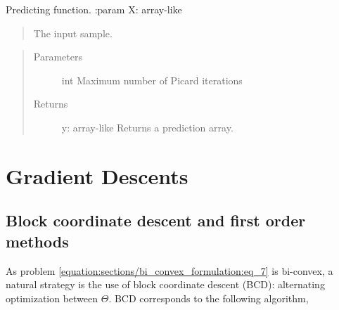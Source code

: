 \documentclass[letterpaper,10pt,english]{sphinxmanual}
\begin{document}
\begin{fulllineitems}
\begin{fulllineitems}
\end{fulllineitems}


\begin{fulllineitems}
\label{\detokenize{sections/learning:IDL.IDLModel.predict}}
Predicting function.
:param X: array-like
\begin{quote}

The input sample.
\end{quote}
\begin{quote}\begin{description}
\item[{Parameters}] \leavevmode
{} \textendash{} int
Maximum number of Picard iterations

\item[{Returns}] \leavevmode
y: array-like
Returns a prediction array.

\end{description}\end{quote}

\end{fulllineitems}


\end{fulllineitems}



\chapter{Gradient Descents}
\label{\detokenize{sections/gradient_descents:gradient-descents}}\label{\detokenize{sections/gradient_descents:id1}}\label{\detokenize{sections/gradient_descents::doc}}

\section{Block coordinate descent and first order methods}
\label{\detokenize{sections/gradient_descents:block-coordinate-descent-and-first-order-methods}}
As problem \eqref{equation:sections/bi_convex_formulation:eq_7} is bi-convex, a natural strategy is the use of block coordinate descent (BCD): alternating
optimization between \(\Theta\). BCD corresponds to the following algorithm,
\end{document}
